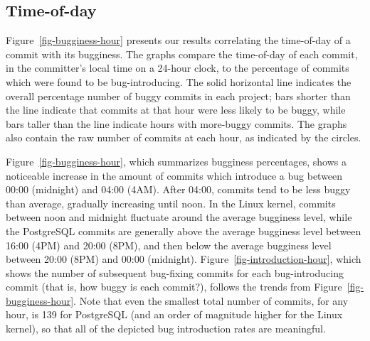 \subsection{Time-of-day} 
\label{sec-time-of-day}

Figure~\ref{fig-bugginess-hour} presents our results correlating the time-of-day
of a commit with its bugginess.  The graphs compare the time-of-day of each
commit, in the committer's local time on a 24-hour clock, to the percentage of
commits which were found to be bug-introducing. The solid horizontal line
indicates the overall percentage number of buggy commits in each project; bars
shorter than the line indicate that commits at that hour were less likely to be
buggy, while bars taller than the line indicate hours with more-buggy
commits. The graphs also contain the raw number of commits at each hour, as
indicated by the circles.


Figure~\ref{fig-bugginess-hour}, which summarizes bugginess percentages, shows a
noticeable increase in the amount of commits which introduce a bug between 00:00
(midnight) and 04:00 (4AM). After 04:00, commits tend to be less buggy than
average, gradually increasing until noon.  In the Linux kernel, commits between
noon and midnight fluctuate around the average bugginess level, while the
PostgreSQL commits are generally above the average bugginess level between 16:00
(4PM) and 20:00 (8PM), and then below the average bugginess level between 20:00
(8PM) and 00:00 (midnight). Figure~\ref{fig-introduction-hour}, which shows the
number of subsequent bug-fixing commits for each bug-introducing commit (that
is, how buggy is each commit?), follows the trends from
Figure~\ref{fig-bugginess-hour}. Note that even the smallest total number of
commits, for any hour, is 139 for PostgreSQL (and an order of magnitude higher
for the Linux kernel), so that all of the depicted bug introduction rates are
meaningful.

